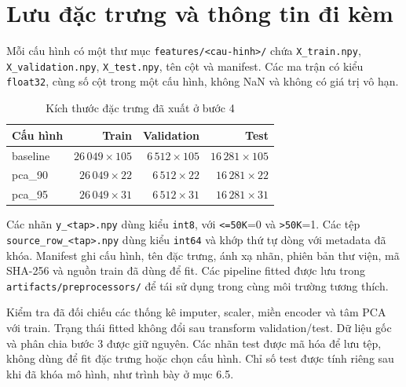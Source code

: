 \section{Lưu đặc trưng và thông tin đi kèm}
\label{sec:4_8}
Mỗi cấu hình có một thư mục \texttt{features/<cau-hinh>/} chứa \texttt{X\_train.npy}, \texttt{X\_validation.npy}, \texttt{X\_test.npy}, tên cột và manifest. Các ma trận có kiểu \texttt{float32}, cùng số cột trong một cấu hình, không NaN và không có giá trị vô hạn.

\begin{table}[htbp]
\centering\small
\caption{Kích thước đặc trưng đã xuất ở bước 4}\label{tab:feature-shapes}
\begin{tabular}{lrrr}
\toprule
Cấu hình & Train & Validation & Test \\
\midrule
baseline & $26\,049\times 105$ & $6\,512\times 105$ & $16\,281\times 105$ \\
pca\_90 & $26\,049\times 22$ & $6\,512\times 22$ & $16\,281\times 22$ \\
pca\_95 & $26\,049\times 31$ & $6\,512\times 31$ & $16\,281\times 31$ \\
\bottomrule
\end{tabular}
\end{table}

Các nhãn \texttt{y\_<tap>.npy} dùng kiểu \texttt{int8}, với \texttt{<=50K}=0 và \texttt{>50K}=1. Các tệp \texttt{source\_row\_<tap>.npy} dùng kiểu \texttt{int64} và khớp thứ tự dòng với metadata đã khóa. Manifest ghi cấu hình, tên đặc trưng, ánh xạ nhãn, phiên bản thư viện, mã SHA-256 và nguồn train đã dùng để fit. Các pipeline fitted được lưu trong \texttt{artifacts/preprocessors/} để tái sử dụng trong cùng môi trường tương thích.

Kiểm tra đã đối chiếu các thống kê imputer, scaler, miền encoder và tâm PCA với train. Trạng thái fitted không đổi sau transform validation/test. Dữ liệu gốc và phân chia bước 3 được giữ nguyên. Các nhãn test được mã hóa để lưu tệp, không dùng để fit đặc trưng hoặc chọn cấu hình. Chỉ số test được tính riêng sau khi đã khóa mô hình, như trình bày ở mục 6.5.
